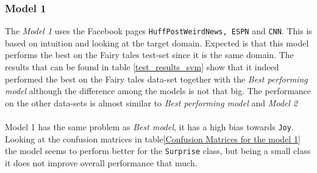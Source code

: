 \documentclass[
10pt, %
a4paper, %
oneside, %
headinclude,footinclude, %
BCOR5mm, %
]{scrartcl}
\begin{document}
\subsubsection{Model 1}
The \textit{Model 1} uses the Facebook pages \texttt{HuffPostWeirdNews, ESPN} and \texttt{CNN}. This is based on intuition and looking at the target domain. Expected is that this model performs the best on the Fairy tales test-set since it is the same domain. The results that can be found in table \ref{test_results_svm} show that it indeed performed the best on the Fairy tales data-set together with the \textit{Best performing model} although the difference among the models is not that big. The performance on the other data-sets is almost similar to  \textit{Best performing model} and \textit{Model 2}\\\\
Model 1 has the same problem as \textit{Best model}, it has a high bias towards \texttt{Joy}. Looking at the confusion matrices in table\ref{Confusion Matrices for the model 1} the model seems to perform better for the \texttt{Surprise} class, but being a small class it does not improve overall performance that much.
\end{document}
